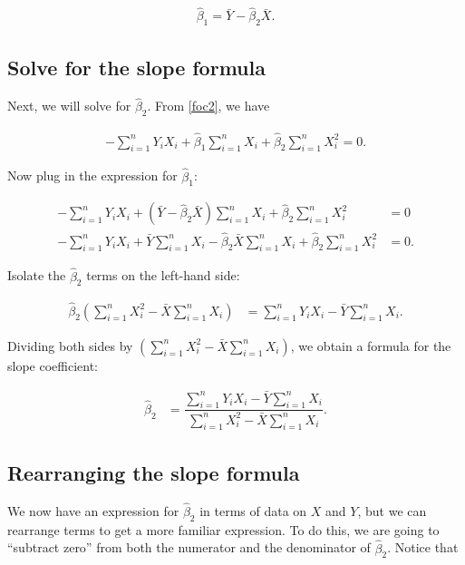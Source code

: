 \documentclass[12pt]{exam}
\begin{document}
\begin{align}
\hat{\beta}_1 = \bar{Y} - \hat{\beta}_2 \bar{X}.
\end{align}

\subsection*{Solve for the slope formula}

\noindent Next, we will solve for $\hat{\beta}_2$. From \autoref{foc2}, we have 

\begin{align}
- \sum_{i=1}^n Y_i X_i + \hat{\beta}_1 \sum_{i=1}^n X_i + \hat{\beta}_2 \sum_{i=1}^n X_i^2 = 0.
\end{align}

\noindent Now plug in the expression for $\hat{\beta}_1$:

\begin{align}
- \sum_{i=1}^n Y_i X_i + (\bar{Y} - \hat{\beta}_2 \bar{X}) \sum_{i=1}^n X_i + \hat{\beta}_2 \sum_{i=1}^n X_i^2 &= 0 \\
- \sum_{i=1}^n Y_i X_i + \bar{Y} \sum_{i=1}^n X_i - \hat{\beta}_2 \bar{X} \sum_{i=1}^n X_i + \hat{\beta}_2 \sum_{i=1}^n X_i^2 &= 0.
\end{align}

\noindent Isolate the $\hat{\beta}_2$ terms on the left-hand side:

\begin{align}
\hat{\beta}_2 (\sum_{i=1}^n X_i^2 - \bar{X} \sum_{i=1}^n X_i) &= \sum_{i=1}^n Y_i X_i -  \bar{Y} \sum_{i=1}^n X_i.
\end{align}

\noindent Dividing both sides by $(\sum_{i=1}^n X_i^2 - \bar{X} \sum_{i=1}^n X_i)$, we obtain a formula for the slope coefficient:

\begin{align}
\hat{\beta}_2 &= \dfrac{\sum_{i=1}^n Y_i X_i -  \bar{Y} \sum_{i=1}^n X_i}{\sum_{i=1}^n X_i^2 - \bar{X} \sum_{i=1}^n X_i}.
\end{align}

\subsection*{Rearranging the slope formula}

\noindent We now have an expression for $\hat{\beta}_2$ in terms of data on $X$ and $Y$, but we can rearrange terms to get a more familiar expression. To do this, we are going to ``subtract zero'' from both the numerator and the denominator of $\hat{\beta}_2$. Notice that 
\end{document}
